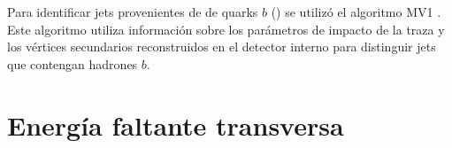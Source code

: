 

Para identificar jets provenientes de de quarks $b$ (\bjets) se utilizó el
algoritmo MV1 \cite{ATLAS-CONF-2014-046,btagging}. Este algoritmo utiliza
información sobre los parámetros de impacto de la traza y los vértices
secundarios reconstruidos en el detector interno para distinguir jets que
contengan hadrones $b$.



\section{Energía faltante transversa}
\label{sec:met_obj}



